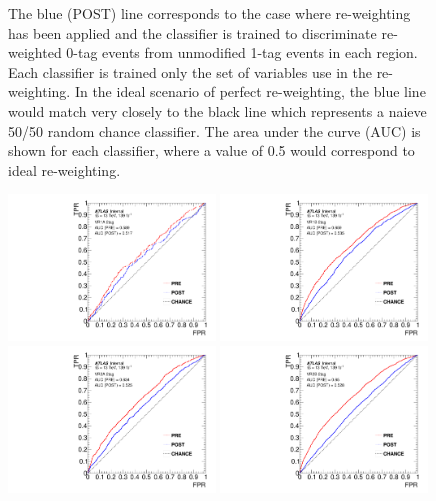 \begin{figure}[htbp!]
{    The blue (POST) line corresponds to the case where re-weighting has been applied and the classifier is trained to discriminate re-weighted 0-tag events from unmodified 1-tag events in each region.
    Each classifier is trained only the set of variables use in the re-weighting.
    In the ideal scenario of perfect re-weighting, the blue line would match very closely to the black line which represents a naieve 50/50 random chance classifier.
    The area under the curve (AUC) is shown for each classifier, where a value of 0.5 would correspond to ideal re-weighting.}
\label{fig:bdt_roc_curves_1tag}
\end{figure}

\begin{figure}[htbp!]
\begin{center}
\includegraphics[width=0.49\textwidth]{BDT/VHqqbbBDTRocCurve_VR1A_2tag.pdf}
\includegraphics[width=0.49\textwidth]{BDT/VHqqbbBDTRocCurve_VR1B_2tag.pdf} \\
\includegraphics[width=0.49\textwidth]{BDT/VHqqbbBDTRocCurve_VR2A_2tag.pdf}
\includegraphics[width=0.49\textwidth]{BDT/VHqqbbBDTRocCurve_VR2B_2tag.pdf}

\end{center}
\end{figure}
